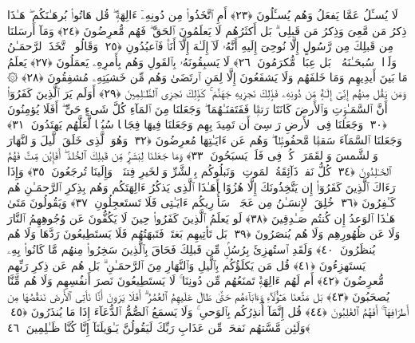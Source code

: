  لَا يُسـَٔلُ عَمَّا يَفعَلُ وَهُم يُسـَٔلُونَ ﴿٢٣﴾
 أَمِ ٱتَّخَذُوا۟ مِن دُونِهِۦٓ ءَالِهَةًۭ ۖ قُل هَاتُوا۟ بُرهَـٰنَكُم ۖ هَـٰذَا ذِكرُ مَن مَّعِىَ وَذِكرُ مَن قَبلِى ۗ بَل أَكثَرُهُم لَا يَعلَمُونَ ٱلحَقَّ ۖ فَهُم مُّعرِضُونَ ﴿٢٤﴾
 وَمَآ أَرسَلنَا مِن قَبلِكَ مِن رَّسُولٍ إِلَّا نُوحِىٓ إِلَيهِ أَنَّهُۥ لَآ إِلَـٰهَ إِلَّآ أَنَا۠ فَٱعبُدُونِ ﴿٢٥﴾
 وَقَالُوا۟ ٱتَّخَذَ ٱلرَّحمَـٰنُ وَلَدًۭا ۗ سُبحَـٰنَهُۥ ۚ بَل عِبَادٌۭ مُّكرَمُونَ ﴿٢٦﴾
 لَا يَسبِقُونَهُۥ بِٱلقَولِ وَهُم بِأَمرِهِۦ يَعمَلُونَ ﴿٢٧﴾
 يَعلَمُ مَا بَينَ أَيدِيهِم وَمَا خَلفَهُم وَلَا يَشفَعُونَ إِلَّا لِمَنِ ٱرتَضَىٰ وَهُم مِّن خَشيَتِهِۦ مُشفِقُونَ ﴿٢٨﴾
 ۞ وَمَن يَقُل مِنهُم إِنِّىٓ إِلَـٰهٌۭ مِّن دُونِهِۦ فَذَٟلِكَ نَجزِيهِ جَهَنَّمَ ۚ كَذَٟلِكَ نَجزِى ٱلظَّـٰلِمِينَ ﴿٢٩﴾
 أَوَلَم يَرَ ٱلَّذِينَ كَفَرُوٓا۟ أَنَّ ٱلسَّمَـٰوَٟتِ وَٱلأَرضَ كَانَتَا رَتقًۭا فَفَتَقنَـٰهُمَا ۖ وَجَعَلنَا مِنَ ٱلمَآءِ كُلَّ شَىءٍ حَىٍّ ۖ أَفَلَا يُؤمِنُونَ ﴿٣٠﴾
 وَجَعَلنَا فِى ٱلأَرضِ رَوَٟسِىَ أَن تَمِيدَ بِهِم وَجَعَلنَا فِيهَا فِجَاجًۭا سُبُلًۭا لَّعَلَّهُم يَهتَدُونَ ﴿٣١﴾
 وَجَعَلنَا ٱلسَّمَآءَ سَقفًۭا مَّحفُوظًۭا ۖ وَهُم عَن ءَايَـٰتِهَا مُعرِضُونَ ﴿٣٢﴾
 وَهُوَ ٱلَّذِى خَلَقَ ٱلَّيلَ وَٱلنَّهَارَ وَٱلشَّمسَ وَٱلقَمَرَ ۖ كُلٌّۭ فِى فَلَكٍۢ يَسبَحُونَ ﴿٣٣﴾
 وَمَا جَعَلنَا لِبَشَرٍۢ مِّن قَبلِكَ ٱلخُلدَ ۖ أَفَإِي۟ن مِّتَّ فَهُمُ ٱلخَـٰلِدُونَ ﴿٣٤﴾
 كُلُّ نَفسٍۢ ذَآئِقَةُ ٱلمَوتِ ۗ وَنَبلُوكُم بِٱلشَّرِّ وَٱلخَيرِ فِتنَةًۭ ۖ وَإِلَينَا تُرجَعُونَ ﴿٣٥﴾
 وَإِذَا رَءَاكَ ٱلَّذِينَ كَفَرُوٓا۟ إِن يَتَّخِذُونَكَ إِلَّا هُزُوًا أَهَـٰذَا ٱلَّذِى يَذكُرُ ءَالِهَتَكُم وَهُم بِذِكرِ ٱلرَّحمَـٰنِ هُم كَـٰفِرُونَ ﴿٣٦﴾
 خُلِقَ ٱلإِنسَـٰنُ مِن عَجَلٍۢ ۚ سَأُو۟رِيكُم ءَايَـٰتِى فَلَا تَستَعجِلُونِ ﴿٣٧﴾
 وَيَقُولُونَ مَتَىٰ هَـٰذَا ٱلوَعدُ إِن كُنتُم صَـٰدِقِينَ ﴿٣٨﴾
 لَو يَعلَمُ ٱلَّذِينَ كَفَرُوا۟ حِينَ لَا يَكُفُّونَ عَن وُجُوهِهِمُ ٱلنَّارَ وَلَا عَن ظُهُورِهِم وَلَا هُم يُنصَرُونَ ﴿٣٩﴾
 بَل تَأتِيهِم بَغتَةًۭ فَتَبهَتُهُم فَلَا يَستَطِيعُونَ رَدَّهَا وَلَا هُم يُنظَرُونَ ﴿٤٠﴾
 وَلَقَدِ ٱستُهزِئَ بِرُسُلٍۢ مِّن قَبلِكَ فَحَاقَ بِٱلَّذِينَ سَخِرُوا۟ مِنهُم مَّا كَانُوا۟ بِهِۦ يَستَهزِءُونَ ﴿٤١﴾
 قُل مَن يَكلَؤُكُم بِٱلَّيلِ وَٱلنَّهَارِ مِنَ ٱلرَّحمَـٰنِ ۗ بَل هُم عَن ذِكرِ رَبِّهِم مُّعرِضُونَ ﴿٤٢﴾
 أَم لَهُم ءَالِهَةٌۭ تَمنَعُهُم مِّن دُونِنَا ۚ لَا يَستَطِيعُونَ نَصرَ أَنفُسِهِم وَلَا هُم مِّنَّا يُصحَبُونَ ﴿٤٣﴾
 بَل مَتَّعنَا هَـٰٓؤُلَآءِ وَءَابَآءَهُم حَتَّىٰ طَالَ عَلَيهِمُ ٱلعُمُرُ ۗ أَفَلَا يَرَونَ أَنَّا نَأتِى ٱلأَرضَ نَنقُصُهَا مِن أَطرَافِهَآ ۚ أَفَهُمُ ٱلغَٰلِبُونَ ﴿٤٤﴾
 قُل إِنَّمَآ أُنذِرُكُم بِٱلوَحىِ ۚ وَلَا يَسمَعُ ٱلصُّمُّ ٱلدُّعَآءَ إِذَا مَا يُنذَرُونَ ﴿٤٥﴾
 وَلَئِن مَّسَّتهُم نَفحَةٌۭ مِّن عَذَابِ رَبِّكَ لَيَقُولُنَّ يَـٰوَيلَنَآ إِنَّا كُنَّا ظَـٰلِمِينَ ﴿٤٦﴾
